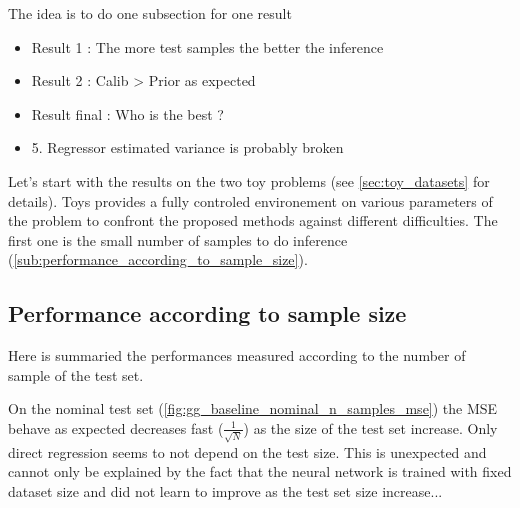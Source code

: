 The idea is to do one subsection for one result 
\begin{itemize}
  \item Result 1 : The more test samples the better the inference
  \item Result 2 : Calib > Prior as expected
  \item Result final : Who is the best ? 
  \item 5. Regressor estimated variance is probably broken
\end{itemize}


Let's start with the results on the two toy problems (see \autoref{sec:toy_datasets} for details).
Toys provides a fully controled environement on various parameters of the problem to confront the proposed methods against different difficulties.
The first one is the small number of samples to do inference (\autoref{sub:performance_according_to_sample_size}).










\subsection{Performance according to sample size} %
\label{sub:performance_according_to_sample_size}

Here is summaried the performances measured according to the number of sample of the test set.

On the nominal test set (\autoref{fig:gg_baseline_nominal_n_samples_mse}) the MSE behave as expected \ie decreases fast ($\frac{1}{\sqrt{N}}$) as the size of the test set increase.
Only direct regression seems to not depend on the test size.
This is unexpected and cannot only be explained by the fact that the neural network is trained with fixed dataset size and did not learn to improve as the test set size increase...



